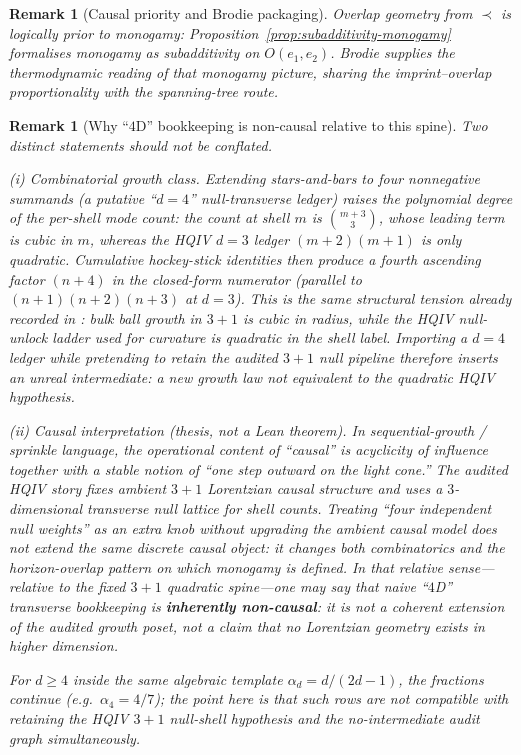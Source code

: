 \documentclass[11pt]{amsart}
\newtheorem{remark}[theorem]{Remark}
\begin{document}
\begin{remark}[Causal priority and Brodie packaging]
\label{rem:causality-monogamy-brodie}
Overlap geometry from \(\prec\) is logically prior to monogamy: Proposition~\ref{prop:subadditivity-monogamy} formalises monogamy as subadditivity on \(O(e_1,e_2)\). Brodie \cite{brodie2026} supplies the thermodynamic reading of that monogamy picture, sharing the imprint--overlap proportionality with the spanning-tree route.
\end{remark}

\begin{remark}[Why ``\(4\)D'' bookkeeping is non-causal relative to this spine]
\label{rem:four-d-noncausal}
Two distinct statements should not be conflated.

\emph{(i) Combinatorial growth class.} Extending stars-and-bars to \emph{four} nonnegative summands (a putative ``\(d=4\)'' null-transverse ledger) raises the \emph{polynomial degree} of the per-shell mode count: the count at shell \(m\) is \(\binom{m+3}{3}\), whose leading term is cubic in \(m\), whereas the HQIV \(d=3\) ledger \((m+2)(m+1)\) is only quadratic. Cumulative hockey-stick identities then produce a fourth ascending factor \((n+4)\) in the closed-form numerator (parallel to \((n+1)(n+2)(n+3)\) at \(d=3\)). This is the same structural tension already recorded in \cite{hqiv-so8-paper}: bulk ball growth in \(3{+}1\) is cubic in radius, while the HQIV \emph{null-unlock} ladder used for curvature is quadratic in the shell label. Importing a \(d=4\) ledger while pretending to retain the audited \(3+1\) null pipeline therefore inserts an \emph{unreal intermediate}: a new growth law not equivalent to the quadratic HQIV hypothesis.

\emph{(ii) Causal interpretation (thesis, not a Lean theorem).} In sequential-growth / sprinkle language, the operational content of ``causal'' is acyclicity of influence together with a stable notion of ``one step outward on the light cone.'' The audited HQIV story fixes ambient \(3{+}1\) Lorentzian causal structure and uses a \(3\)-dimensional transverse null lattice for shell counts. Treating ``four independent null weights'' as an extra knob without upgrading the ambient causal model does not extend the \emph{same} discrete causal object: it changes both combinatorics and the horizon-overlap pattern on which monogamy is defined. In that \emph{relative} sense---relative to the fixed \(3+1\) quadratic spine---one may say that naive ``\(4\)D'' transverse bookkeeping is \textbf{inherently non-causal}: it is not a coherent extension of the audited growth poset, not a claim that no Lorentzian geometry exists in higher dimension.

For \(d\ge 4\) inside the \emph{same} algebraic template \(\alpha_d=d/(2d-1)\), the fractions continue (e.g.\ \(\alpha_4=4/7\)); the point here is that such rows are \emph{not} compatible with retaining the HQIV \(3+1\) null-shell hypothesis and the no-intermediate audit graph simultaneously.
\end{remark}
\end{document}
